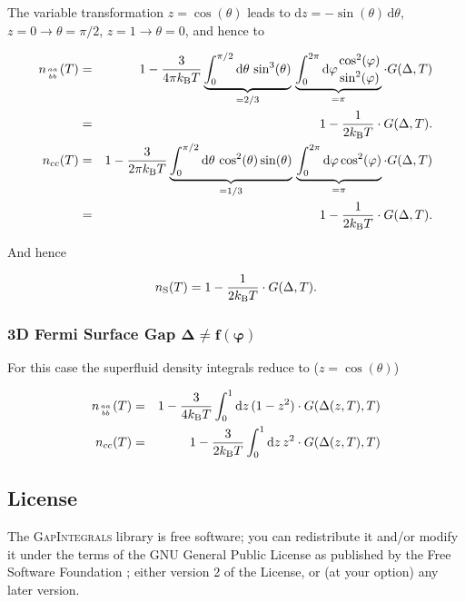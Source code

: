 \documentclass[twoside]{article}
\newcommand{\gapint}{\textsc{GapIntegrals}\xspace}
\begin{document}
\noindent The variable transformation $z = \cos(\theta)$ leads to $\mathrm{d}z = -\sin(\theta)\,\mathrm{d}\theta$, $z=0 \to \theta=\pi/2$, $z=1 \to \theta=0$, and hence to

\begin{eqnarray*}
 n_{aa \atop bb}(T) &=& 1 - \frac{3}{4\pi k_{\rm B} T} \underbrace{\int_0^{\pi/2} \mathrm{d}\theta \, \sin^3(\theta)}_{= 2/3} \, \underbrace{\int_0^{2\pi} \mathrm{d}\varphi {\cos^2(\varphi) \atop \sin^2(\varphi)}}_{=\pi} \cdot G(\Delta, T) \\
 &=& 1 - \frac{1}{2 k_{\rm B} T} \cdot G(\Delta, T). \\
 n_{cc}(T) &=& 1 - \frac{3}{2\pi k_{\rm B} T} \underbrace{\int_0^{\pi/2} \mathrm{d}\theta \, \cos^2(\theta)\sin(\theta)}_{=1/3} \, \underbrace{\int_0^{2\pi} \mathrm{d}\varphi \cos^2(\varphi)}_{=\pi} \cdot G(\Delta, T) \\
 &=&  1 - \frac{1}{2 k_{\rm B} T} \cdot G(\Delta, T). 
\end{eqnarray*}

\noindent And hence

$$ n_{\rm S}(T) = 1- \frac{1}{2 k_{\rm B} T} \cdot G(\Delta, T). $$

\subsubsection*{3D Fermi Surface Gap $\mathbf{\Delta \neq f(\bm\varphi)}$}

For this case the superfluid density integrals reduce to ($z=\cos(\theta)$)

\begin{eqnarray}
  n_{aa \atop bb}(T) &=& 1 - \frac{3}{4 k_{\rm B} T} \int_0^1 \mathrm{d}z\, (1-z^2) \cdot G(\Delta(z, T),T) \\
  n_{cc}(T) &=& 1 - \frac{3}{2 k_{\rm B} T} \int_0^1 \mathrm{d}z\, z^2 \cdot G(\Delta(z, T),T)
\end{eqnarray}



\subsection*{License}
The \gapint library is free software; you can redistribute it and/or modify it under the terms of the GNU General Public License as published by the Free Software Foundation \cite{GPL}; either version 2 of the License, or (at your option) any later version.
\end{document}
